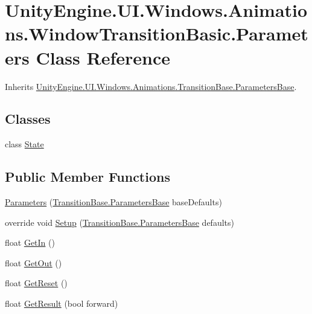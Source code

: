 \hypertarget{class_unity_engine_1_1_u_i_1_1_windows_1_1_animations_1_1_window_transition_basic_1_1_parameters}{}\section{Unity\+Engine.\+U\+I.\+Windows.\+Animations.\+Window\+Transition\+Basic.\+Parameters Class Reference}
\label{class_unity_engine_1_1_u_i_1_1_windows_1_1_animations_1_1_window_transition_basic_1_1_parameters}


Inherits \hyperlink{class_unity_engine_1_1_u_i_1_1_windows_1_1_animations_1_1_transition_base_1_1_parameters_base}{Unity\+Engine.\+U\+I.\+Windows.\+Animations.\+Transition\+Base.\+Parameters\+Base}.

\subsection*{Classes}
\begin{DoxyCompactItemize}
\item 
class \hyperlink{class_unity_engine_1_1_u_i_1_1_windows_1_1_animations_1_1_window_transition_basic_1_1_parameters_1_1_state}{State}
\end{DoxyCompactItemize}
\subsection*{Public Member Functions}
\begin{DoxyCompactItemize}
\item 
\hyperlink{class_unity_engine_1_1_u_i_1_1_windows_1_1_animations_1_1_window_transition_basic_1_1_parameters_a35fae7c36d6907fdc58ecfb42632e0c5}{Parameters} (\hyperlink{class_unity_engine_1_1_u_i_1_1_windows_1_1_animations_1_1_transition_base_1_1_parameters_base}{Transition\+Base.\+Parameters\+Base} base\+Defaults)
\item 
override void \hyperlink{class_unity_engine_1_1_u_i_1_1_windows_1_1_animations_1_1_window_transition_basic_1_1_parameters_a1ef2825d077e65ff1fa5178ce55c226d}{Setup} (\hyperlink{class_unity_engine_1_1_u_i_1_1_windows_1_1_animations_1_1_transition_base_1_1_parameters_base}{Transition\+Base.\+Parameters\+Base} defaults)
\item 
float \hyperlink{class_unity_engine_1_1_u_i_1_1_windows_1_1_animations_1_1_window_transition_basic_1_1_parameters_ad6c0cd1efcd4b1410a2687992b57c383}{Get\+In} ()
\item 
float \hyperlink{class_unity_engine_1_1_u_i_1_1_windows_1_1_animations_1_1_window_transition_basic_1_1_parameters_a8771e6fb1041baa1dc1bc9c2418a19d6}{Get\+Out} ()
\item 
float \hyperlink{class_unity_engine_1_1_u_i_1_1_windows_1_1_animations_1_1_window_transition_basic_1_1_parameters_a2def117f91baa72da9ffa4a384866370}{Get\+Reset} ()
\item 
float \hyperlink{class_unity_engine_1_1_u_i_1_1_windows_1_1_animations_1_1_window_transition_basic_1_1_parameters_a88b1dae8a372cce75816992d15874161}{Get\+Result} (bool forward)
\end{DoxyCompactItemize}
